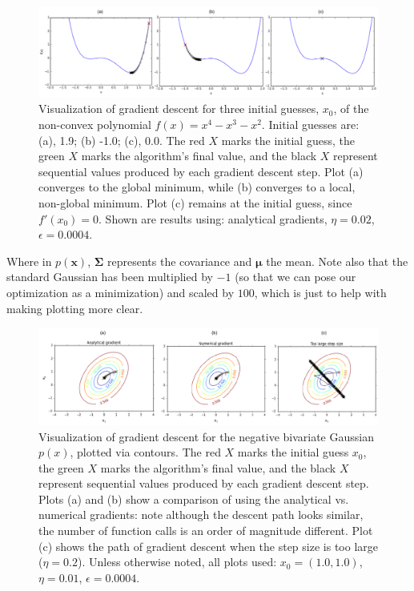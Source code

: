 \documentclass[10pt]{article}
\begin{document}
\begin{figure}[!ht]
\centering
\includegraphics[scale=0.9]{polynomialdescent.pdf}
\caption{Visualization of gradient descent for three initial guesses, $x_0$, of the non-convex polynomial $f(x) = x^4 - x^3 -x^2$.  Initial guesses are: (a), 1.9; (b) -1.0; (c), 0.0.  The red $X$ marks the initial guess, the green $X$ marks the algorithm's final value, and the black $X$ represent sequential values produced by each gradient descent step. Plot (a) converges to the global minimum, while (b) converges to a local, non-global minimum.  Plot (c) remains at the initial guess, since $f'(x_0)=0$. Shown are results using: analytical gradients, $\eta = 0.02$, $\epsilon = 0.0004$.}
\label{poly}
\end{figure}

Where in $p(\mathbf{x})$, $\mathbf{\Sigma}$ represents the covariance and $\boldsymbol{\mu}$ the mean.  Note also that the standard Gaussian has been multiplied by $-1$ (so that we can pose our optimization as a minimization) and scaled by $100$, which is just to help with making plotting more clear.

\begin{figure}[!ht]
\centering
\includegraphics[scale=0.9]{negGaussianDescent.pdf}
\caption{Visualization of gradient descent for the negative bivariate Gaussian $p(x)$, plotted via contours.  The red $X$ marks the initial guess $x_0$, the green $X$ marks the algorithm's final value, and the black $X$ represent sequential values produced by each gradient descent step.  Plots (a) and (b) show a comparison of using the analytical vs. numerical gradients: note although the descent path looks similar, the number of function calls is an order of magnitude different.   Plot (c) shows the path of gradient descent when the step size is too large ($\eta = 0.2$). Unless otherwise noted, all plots used: $x_0 = (1.0,1.0)$, $\eta = 0.01$, $\epsilon = 0.0004$.}
\label{gauss}
\end{figure}
\end{document}
